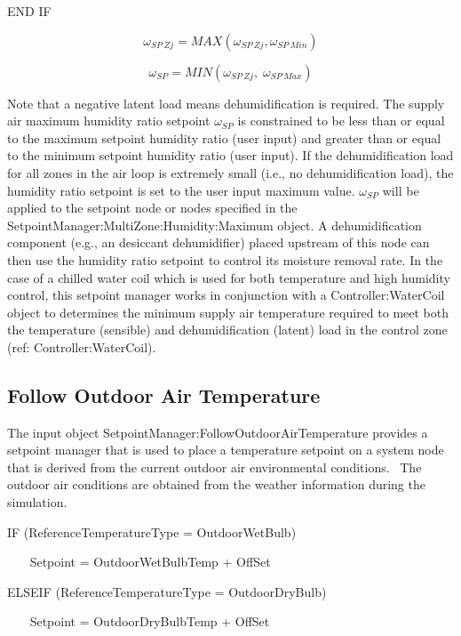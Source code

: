 END IF

\begin{equation}
{\omega_{SP~Zj}} = MAX\left( {{\omega_{SP~Zj}},{\omega_{SP~Min}}} \right)
\end{equation}

\begin{equation}
{\omega_{SP}} = MIN\left( {{\omega_{SP~Zj}},\;{\omega_{SP~Max}}} \right)
\end{equation}

Note that a negative latent load means dehumidification is required. The supply air maximum humidity ratio setpoint \({\omega_{SP}}\) is constrained to be less than or equal to the maximum setpoint humidity ratio (user input) and greater than or equal to the minimum setpoint humidity ratio (user input). If the dehumidification load for all zones in the air loop is extremely small (i.e., no dehumidification load), the humidity ratio setpoint is set to the user input maximum value. \({\omega_{SP}}\) will be applied to the setpoint node or nodes specified in the SetpointManager:MultiZone:Humidity:Maximum object. A dehumidification component (e.g., an desiccant dehumidifier) placed upstream of this node can then use the humidity ratio setpoint to control its moisture removal rate. In the case of a chilled water coil which is used for both temperature and high humidity control, this setpoint manager works in conjunction with a Controller:WaterCoil object to determines the minimum supply air temperature required to meet both the temperature (sensible) and dehumidification (latent) load in the control zone (ref: Controller:WaterCoil).

\subsection{Follow Outdoor Air Temperature}\label{follow-outdoor-air-temperature}

The input object SetpointManager:FollowOutdoorAirTemperature provides a setpoint manager that is used to place a temperature setpoint on a system node that is derived from the current outdoor air environmental conditions.~ The outdoor air conditions are obtained from the weather information during the simulation.

IF (ReferenceTemperatureType = OutdoorWetBulb)

~~~ Setpoint = OutdoorWetBulbTemp + OffSet

ELSEIF (ReferenceTemperatureType = OutdoorDryBulb)

~~~ Setpoint = OutdoorDryBulbTemp + OffSet

